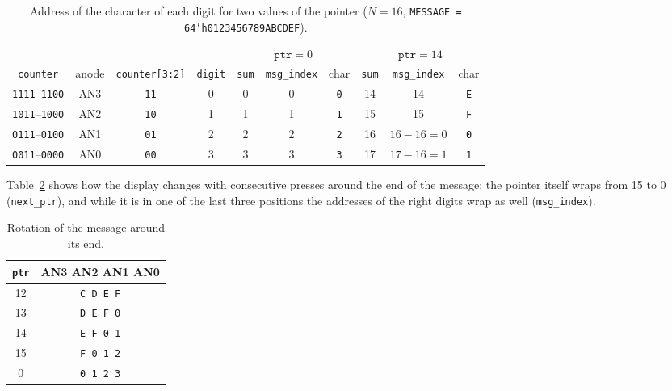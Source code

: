 \documentclass{article}
\begin{document}
\begin{table}[htbp]
  \centering
  \small
  \begin{tabular}{cccc|ccc|ccc}
    \toprule
    & & & & \multicolumn{3}{c|}{$\texttt{ptr} = 0$} & \multicolumn{3}{c}{$\texttt{ptr} = 14$} \\
    \texttt{counter} & anode & \texttt{counter[3:2]} & \texttt{digit}
      & \texttt{sum} & \texttt{msg\_index} & char
      & \texttt{sum} & \texttt{msg\_index} & char \\
    \midrule
    \texttt{1111}--\texttt{1100} & AN3 & \texttt{11} & 0 & 0 & 0 & \texttt{0} & 14 & 14 & \texttt{E} \\
    \texttt{1011}--\texttt{1000} & AN2 & \texttt{10} & 1 & 1 & 1 & \texttt{1} & 15 & 15 & \texttt{F} \\
    \texttt{0111}--\texttt{0100} & AN1 & \texttt{01} & 2 & 2 & 2 & \texttt{2} & 16 & $16 - 16 = 0$ & \texttt{0} \\
    \texttt{0011}--\texttt{0000} & AN0 & \texttt{00} & 3 & 3 & 3 & \texttt{3} & 17 & $17 - 16 = 1$ & \texttt{1} \\
    \bottomrule
  \end{tabular}
  \caption{Address of the character of each digit for two values of the pointer
           ($N = 16$, \texttt{MESSAGE = 64'h0123456789ABCDEF}).}
  \label{tab:c-index}
\end{table}

Table~\ref{tab:c-rotation} shows how the display changes with consecutive
presses around the end of the message: the pointer itself wraps from 15 to 0
(\texttt{next\_ptr}), and while it is in one of the last three positions the
addresses of the right digits wrap as well (\texttt{msg\_index}).

\begin{table}[htbp]
  \centering
  \small
  \begin{tabular}{cc}
    \toprule
    \texttt{ptr} & AN3 AN2 AN1 AN0 \\
    \midrule
    12 & \texttt{C D E F} \\
    13 & \texttt{D E F 0} \\
    14 & \texttt{E F 0 1} \\
    15 & \texttt{F 0 1 2} \\
    0  & \texttt{0 1 2 3} \\
    \bottomrule
  \end{tabular}
  \caption{Rotation of the message around its end.}
  \label{tab:c-rotation}
\end{table}
\end{document}
